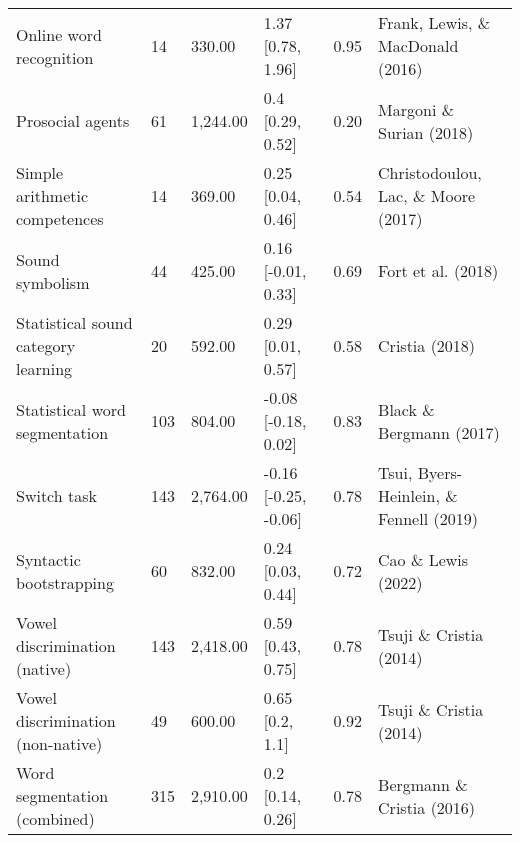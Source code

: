 \documentclass[
]{article}
\begin{document}
\begin{table}[tbp]
\begin{center}
\begin{threeparttable}
\begin{tabular}{llllll}
Online word recognition & 14 & 330.00 & 1.37 [0.78, 1.96] & 0.95 & Frank, Lewis, \& MacDonald (2016)\\
Prosocial agents & 61 & 1,244.00 & 0.4 [0.29, 0.52] & 0.20 & Margoni \& Surian (2018)\\
Simple arithmetic competences & 14 & 369.00 & 0.25 [0.04, 0.46] & 0.54 & Christodoulou, Lac, \& Moore (2017)\\
Sound symbolism & 44 & 425.00 & 0.16 [-0.01, 0.33] & 0.69 & Fort et al. (2018)\\
Statistical sound category learning & 20 & 592.00 & 0.29 [0.01, 0.57] & 0.58 & Cristia (2018)\\
Statistical word segmentation & 103 & 804.00 & -0.08 [-0.18, 0.02] & 0.83 & Black \& Bergmann (2017)\\
Switch task & 143 & 2,764.00 & -0.16 [-0.25, -0.06] & 0.78 & Tsui, Byers-Heinlein, \& Fennell (2019)\\
Syntactic bootstrapping & 60 & 832.00 & 0.24 [0.03, 0.44] & 0.72 & Cao \& Lewis (2022)\\
Vowel discrimination (native) & 143 & 2,418.00 & 0.59 [0.43, 0.75] & 0.78 & Tsuji \& Cristia (2014)\\
Vowel discrimination (non-native) & 49 & 600.00 & 0.65 [0.2, 1.1] & 0.92 & Tsuji \& Cristia (2014)\\
Word segmentation (combined) & 315 & 2,910.00 & 0.2 [0.14, 0.26] & 0.78 & Bergmann \& Cristia (2016)\\
\bottomrule
\end{tabular}

\end{threeparttable}
\end{center}

\end{table}
\end{document}
